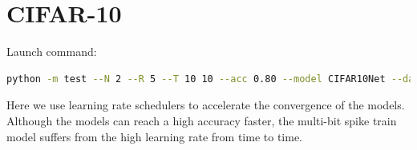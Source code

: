     \section{CIFAR-10}
    \label{appendix:firerate_cifar10}
        Launch command: 
        \begin{lstlisting}[language=Bash, basicstyle=\small, breaklines=true]
python -m test --N 2 --R 5 --T 10 10 --acc 0.80 --model CIFAR10Net --data-path /scratch/zyi/codeSpace/data --dataset CIFAR10 --batch-size 128 --opt adam --lr 1e-5 --lr-scheduler none --epochs 1000 --lr-warmup-epochs 0 --output-dir /scratch/zyi/codeSpace/MultibitSpikes/firerate
        \end{lstlisting}

        Here we use learning rate schedulers to accelerate the convergence of the models. Although the models can reach a high accuracy faster, the multi-bit spike train model suffers from the high learning rate from time to time. 

